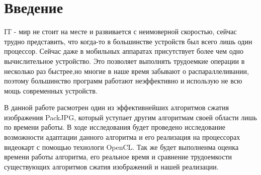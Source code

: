 \documentclass{matmex-diploma-custom}
\begin{document}
\maketitle
\tableofcontents
\newpage
\section*{Введение}

    IT - мир не стоит на  месте и развивается с неимоверной скоростью, сейчас трудно представить, что когда-то в большинстве устройств был всего лишь один процессор. Сейчас даже в мобильных аппаратах присутствует более чем одно вычислительное устройство. Это позволяет выполнять трудоемкие операции в несколько раз быстрее,но многие в наше время забывают о распараллеливании, поэтому большинство программ работают неэффективно и использую не всю мощь современных устройств.

 В данной работе расмотрен один из эффективнейших алгоритмов сжатия изображения PackJPG, который уступает другим алгоритмам своей области лишь по времени работы. В ходе исследования будет проведено исследование возможности адаптации данного алгоритма и его реализация на процессорах видеокарт с помощью технологи OpenCL. Так же будет выполненма оценка времени работы алгоритма, его реальное время и сравнение трудоемкости существующих алгоритмов сжатия изображений и  нашей реализации.
\end{document}

